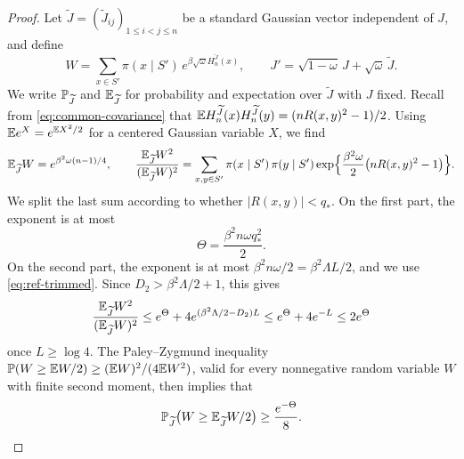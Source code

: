 \begin{proof}
Let $\widetilde J=(\widetilde J_{ij})_{1\le i<j\le n}$ be a standard Gaussian vector independent of
$J$, and define
\[
 W=\sum_{x\in S'}\pi(x\mid S')\,e^{\beta\sqrt\omega H_n^{\widetilde J}(x)},\qquad
 J'=\sqrt{1-\omega}\,J+\sqrt\omega\,\widetilde J .
\]
We write $\mathbb P_{\widetilde J}$ and $\mathbb E_{\widetilde J}$ for probability and expectation over $\widetilde J$ with
$J$ fixed. Recall from \eqref{eq:common-covariance} that
$\mathbb E H_n^{\widetilde J}(x)H_n^{\widetilde J}(y)=(nR(x,y)^2-1)/2$. Using $\mathbb E e^X=e^{\mathbb E X^2/2}$ for a
centered Gaussian variable $X$, we find
\[
 \mathbb E_{\widetilde J}W=e^{\beta^2\omega(n-1)/4},\qquad
 \frac{\mathbb E_{\widetilde J}W^2}{(\mathbb E_{\widetilde J}W)^2}
 =\sum_{x,y\in S'}\pi(x\mid S')\,\pi(y\mid S')\exp\Bigl\{\frac{\beta^2\omega}2
     \bigl(nR(x,y)^2-1\bigr)\Bigr\}.
\]
We split the last sum according to whether $|R(x,y)|<q_*$. On the
first part, the exponent is at most
\[
 \Theta=\frac{\beta^2n\omega q_*^2}2 .
\]
On the second part, the exponent is at most $\beta^2n\omega/2=\beta^2\Lambda L/2$,
and we use \eqref{eq:ref-trimmed}. Since $D_2>\beta^2\Lambda/2+1$, this
gives
\[
 \frac{\mathbb E_{\widetilde J}W^2}{(\mathbb E_{\widetilde J}W)^2}
 \le e^{\Theta}+4e^{(\beta^2\Lambda/2-D_2)L}
 \le e^{\Theta}+4e^{-L}
 \le 2e^{\Theta}
\]
once $L\ge\log4$. The Paley--Zygmund inequality
$\mathbb P(W\ge\mathbb E W/2)\ge(\mathbb E W)^2/(4\mathbb E W^2)$, valid for every nonnegative random
variable $W$ with finite second moment, then implies that
\begin{equation}\label{eq:ref-PZ}
 \mathbb P_{\widetilde J}\bigl(W\ge\mathbb E_{\widetilde J}W/2\bigr)\ge\frac{e^{-\Theta}}8 .
\end{equation}


\end{proof}
